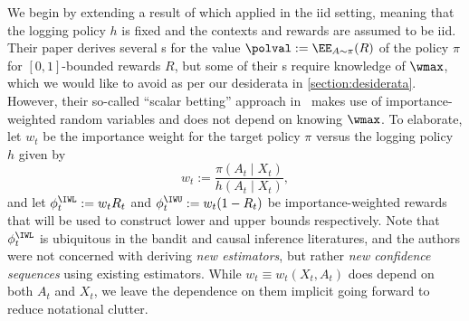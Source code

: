 We begin by extending a result of \citet[Section 5.2]{karampatziakis2021off} which applied in the iid setting, meaning that the logging policy $h$ is fixed and the contexts and rewards are assumed to be iid. Their paper derives several \cs{}s for the value $\polval := \EE_{A \sim \pi}(R)$ of the policy $\pi$ for $[0, 1]$-bounded
rewards $R$, but some of their \cs{}s require knowledge of $\wmax$, which we would like to avoid as per our desiderata in \cref{section:desiderata}. However, their so-called ``scalar betting'' approach in~\citep[Section 5.2]{karampatziakis2021off} makes use of importance-weighted random variables and does not depend on knowing $\wmax$. To elaborate, let $w_t$ be the importance weight for the target policy $\pi$ versus the logging policy $h$ given by
  \begin{equation}
    w_t := \frac{\pi(A_t \mid X_t)}{h(A_t \mid X_t)},
  \end{equation}
  and let $\phi_t^\IWL := w_t R_t$ and $\phi_t^\IWU := w_t(1-R_t)$ be importance-weighted rewards that will be used to construct lower and upper bounds respectively. Note that $\phi_t^\IWL$ is ubiquitous in the bandit and causal inference literatures, and the authors were not concerned with deriving \emph{new estimators}, but rather \emph{new confidence sequences} using existing estimators. While $w_t \equiv w_t(X_t, A_t)$ does depend on both $A_t$ and $X_t$, we leave the dependence on them implicit going forward to reduce notational clutter.

